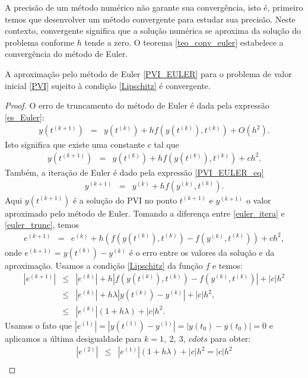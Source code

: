 A precisão de um método numérico não garante sua convergência, isto é, primeiro temos que desenvolver um método convergente para estudar sua precisão. Neste contexto, convergente significa que a solução numérica se aproxima da solução do problema conforme $h$ tende a zero. O teorema \ref{teo_conv_euler} estabelece a convergência do método de Euler.
\begin{teo}\label{teo_conv_euler} A aproximação pelo método de Euler \eqref{PVI_EULER} para o problema de valor inicial \eqref{PVI} sujeito à condição \eqref{Lipschitz} é convergente.
\end{teo}
\begin{proof}
 O erro de truncamento do método de Euler é dada pela expressão \eqref{es_Euler}:
 \begin{eqnarray*}
y(t^{(k+1)})&=&y(t^{(k)})+hf(y(t^{(k)}),t^{(k)})+O(h^2).
\end{eqnarray*}
Isto significa que existe uma constante $c$ tal que
\begin{eqnarray}\label{euler_trunc}
y(t^{(k+1)})&=&y(t^{(k)})+hf(y(t^{(k)}),t^{(k)})+ch^2.
\end{eqnarray}
Também, a iteração de Euler é dado pela expressão \eqref{PVI_EULER_eq}
\begin{eqnarray}\label{euler_itera}
y^{(k+1)}&=&y^{(k)}+hf(y^{(k)},t^{(k)}).
\end{eqnarray}
Aqui $y(t^{(k+1)})$ é a solução do PVI no ponto $t^{(k+1)}$ e $y^{(k+1)}$ o valor aproximado pelo método de Euler. Tomando a diferença entre \eqref{euler_itera} e \eqref{euler_trunc}, temos
\begin{eqnarray}
e^{(k+1)}&=&e^{(k)}+h\left(f(y(t^{(k)}),t^{(k)})-f(y^{(k)},t^{(k)})\right)+ch^2,
\end{eqnarray}
onde $e^{(k+1)}=y(t^{(k)})-y^{(k)}$ é o erro entre os valores da solução e da aproximação. Usamos a condição \eqref{Lipschitz} da função $f$ e temos:
\begin{eqnarray*}
|e^{(k+1)}|&\leq &|e^{(k)}|+h\left|f(y(t^{(k)}),t^{(k)})-f(y^{(k)},t^{(k)})\right|+|c|h^2\\
&\leq &|e^{(k)}|+h\lambda \left|y(t^{(k)})-y^{(k)}\right|+|c|h^2,\\
&\leq &|e^{(k)}|\left(1+h\lambda\right)+|c|h^2.
\end{eqnarray*}
Usamos o fato que $|e^{(1)}|=|y(t^{(1)})-y^{(1)}|=|y(t_0)-y(t_0)|=0$ e aplicamos a última desigualdade para $k=1,\ 2,\ 3,\ cdots $ para obter: 
\begin{eqnarray*}
|e^{(2)}|&\leq &|e^{(1)}|\left(1+h\lambda\right)+|c|h^2=|c|h^2\\

\end{eqnarray*}
\end{proof}
